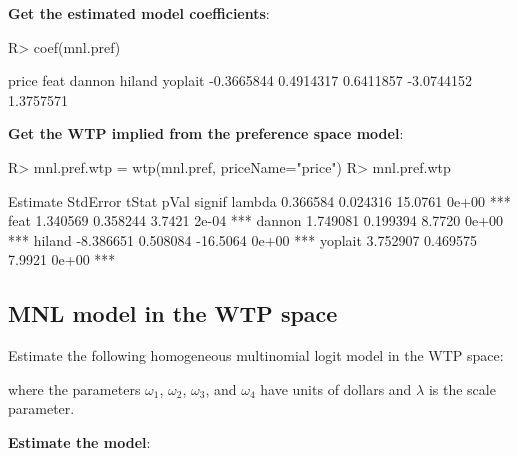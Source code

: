 \documentclass[article]{jss}
\begin{document}
\textbf{Get the estimated model coefficients}:

\begin{CodeChunk}

\begin{CodeInput}
R> coef(mnl.pref)
\end{CodeInput}

\begin{CodeOutput}
     price       feat     dannon     hiland    yoplait 
-0.3665844  0.4914317  0.6411857 -3.0744152  1.3757571 
\end{CodeOutput}
\end{CodeChunk}

\textbf{Get the WTP implied from the preference space model}:

\begin{CodeChunk}

\begin{CodeInput}
R> mnl.pref.wtp = wtp(mnl.pref, priceName="price")
R> mnl.pref.wtp
\end{CodeInput}

\begin{CodeOutput}
         Estimate StdError    tStat  pVal signif
lambda   0.366584 0.024316  15.0761 0e+00    ***
feat     1.340569 0.358244   3.7421 2e-04    ***
dannon   1.749081 0.199394   8.7720 0e+00    ***
hiland  -8.386651 0.508084 -16.5064 0e+00    ***
yoplait  3.752907 0.469575   7.9921 0e+00    ***
\end{CodeOutput}
\end{CodeChunk}

\hypertarget{mnl-model-in-the-wtp-space}{%
\subsection{MNL model in the WTP
space}\label{mnl-model-in-the-wtp-space}}

Estimate the following homogeneous multinomial logit model in the WTP
space:



where the parameters \(\omega_1\), \(\omega_2\), \(\omega_3\), and
\(\omega_4\) have units of dollars and \(\lambda\) is the scale
parameter.

\textbf{Estimate the model}:
\end{document}
